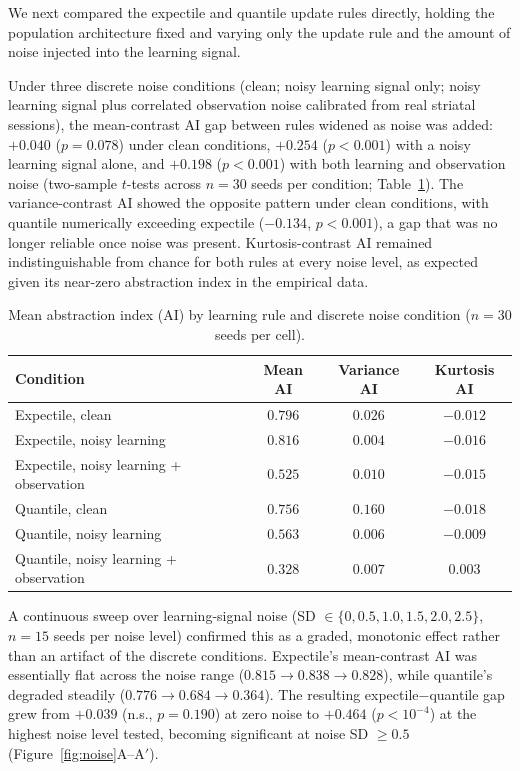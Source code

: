 \documentclass[11pt]{article}
\begin{document}
We next compared the expectile and quantile update rules directly, holding the population architecture fixed and varying only the update rule and the amount of noise injected into the learning signal.

Under three discrete noise conditions (clean; noisy learning signal only; noisy learning signal plus correlated observation noise calibrated from real striatal sessions), the mean-contrast AI gap between rules widened as noise was added: $+0.040$ ($p=0.078$) under clean conditions, $+0.254$ ($p<0.001$) with a noisy learning signal alone, and $+0.198$ ($p<0.001$) with both learning and observation noise (two-sample $t$-tests across $n=30$ seeds per condition; Table~\ref{tab:noise-discrete}). The variance-contrast AI showed the opposite pattern under clean conditions, with quantile numerically exceeding expectile ($-0.134$, $p<0.001$), a gap that was no longer reliable once noise was present. Kurtosis-contrast AI remained indistinguishable from chance for both rules at every noise level, as expected given its near-zero abstraction index in the empirical data.

\begin{table}[htbp]
    \centering
    \caption{Mean abstraction index (AI) by learning rule and discrete noise condition ($n=30$ seeds per cell).}
    \label{tab:noise-discrete}
    \begin{tabular}{lccc}
        \toprule
        Condition & Mean AI & Variance AI & Kurtosis AI \\
        \midrule
        Expectile, clean        & $0.796$ & $0.026$ & $-0.012$ \\
        Expectile, noisy learning & $0.816$ & $0.004$ & $-0.016$ \\
        Expectile, noisy learning + observation & $0.525$ & $0.010$ & $-0.015$ \\
        Quantile, clean         & $0.756$ & $0.160$ & $-0.018$ \\
        Quantile, noisy learning  & $0.563$ & $0.006$ & $-0.009$ \\
        Quantile, noisy learning + observation & $0.328$ & $0.007$ & $0.003$ \\
        \bottomrule
    \end{tabular}
\end{table}

A continuous sweep over learning-signal noise (SD $\in \{0, 0.5, 1.0, 1.5, 2.0, 2.5\}$, $n=15$ seeds per noise level) confirmed this as a graded, monotonic effect rather than an artifact of the discrete conditions. Expectile's mean-contrast AI was essentially flat across the noise range ($0.815 \to 0.838 \to 0.828$), while quantile's degraded steadily ($0.776 \to 0.684 \to 0.364$). The resulting expectile$-$quantile gap grew from $+0.039$ (n.s., $p=0.190$) at zero noise to $+0.464$ ($p<10^{-4}$) at the highest noise level tested, becoming significant at noise SD $\ge 0.5$ (Figure~\ref{fig:noise}A--A$'$).
\end{document}
